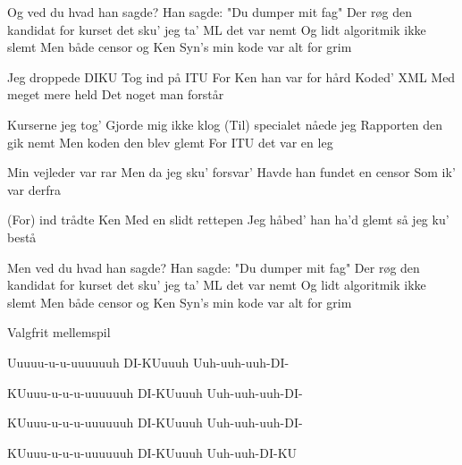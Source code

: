 \documentclass[a4paper,11pt]{article}
\begin{document}
\begin{song}
Og ved du hvad han sagde?
Han sagde:
 "Du dumper mit fag"
 Der røg den kandidat for
kurset det sku' jeg ta'
ML det var nemt
Og lidt algoritmik ikke slemt
Men både censor og Ken
Syn's min kode var alt for grim

Jeg droppede DIKU
Tog ind på ITU
For Ken han var for hård
Koded' XML
Med meget mere held
Det noget man forstår

Kurserne jeg tog'
Gjorde mig ikke klog
(Til) specialet nåede jeg
Rapporten den gik nemt
Men koden den blev glemt
For ITU det var en leg

Min vejleder var rar
Men da jeg sku' forsvar'
Havde han fundet en censor
Som ik' var derfra

(For) ind trådte Ken
Med en slidt rettepen
Jeg håbed' han ha'd glemt
så jeg ku' bestå

Men ved du hvad han sagde?
Han sagde:
 "Du dumper mit fag"
 Der røg den kandidat for
kurset det sku' jeg ta'
ML det var nemt
Og lidt algoritmik ikke slemt
Men både censor og Ken
Syn's min kode var alt for grim

{\scene Valgfrit mellemspil}

Uuuuu-u-u-uuuuuuh
DI-KUuuuh
Uuh-uuh-uuh-DI-

KUuuu-u-u-u-uuuuuuh
DI-KUuuuh
Uuh-uuh-uuh-DI-

KUuuu-u-u-u-uuuuuuh
DI-KUuuuh
Uuh-uuh-uuh-DI-

KUuuu-u-u-u-uuuuuuh
DI-KUuuuh
Uuh-uuh-DI-KU
\end{song}
\end{document}
